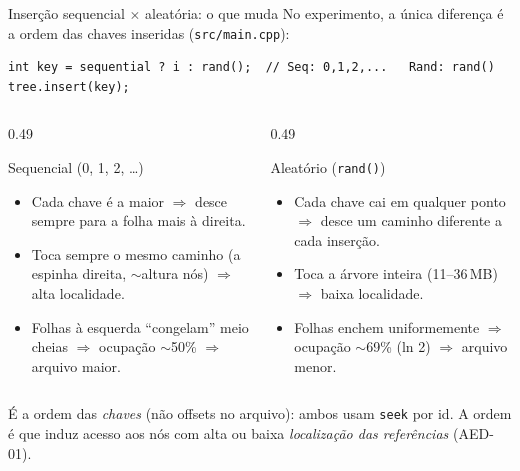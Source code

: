 \documentclass[aspectratio=169,11pt]{beamer}
\begin{document}
\begin{frame}[fragile]{Inserção sequencial {\small$\times$} aleatória: o que muda}
  \footnotesize No experimento, a única diferença é a \alert{ordem das chaves}
  inseridas (\texttt{src/main.cpp}):
  \begin{lstlisting}[basicstyle=\ttfamily\scriptsize]
int key = sequential ? i : rand();  // Seq: 0,1,2,...   Rand: rand()
tree.insert(key);
  \end{lstlisting}
  \vspace{-0.1em}
  \begin{columns}[T,onlytextwidth]
    \begin{column}{0.49\textwidth}
      \begin{block}{Sequencial (0, 1, 2, \dots)}
        \scriptsize
        \begin{itemize}
          \item Cada chave é a maior $\Rightarrow$ desce sempre para a
            \alert{folha mais à direita}.
          \item Toca sempre o mesmo caminho (a \alert{espinha direita},
            $\sim$altura nós) $\Rightarrow$ \alert{alta localidade}.
          \item Folhas à esquerda ``congelam'' meio cheias $\Rightarrow$
            ocupação $\sim$50\% $\Rightarrow$ arquivo \alert{maior}.
        \end{itemize}
      \end{block}
    \end{column}
    \begin{column}{0.49\textwidth}
      \begin{block}{Aleatório (\texttt{rand()})}
        \scriptsize
        \begin{itemize}
          \item Cada chave cai em qualquer ponto $\Rightarrow$ desce um
            \alert{caminho diferente} a cada inserção.
          \item Toca a \alert{árvore inteira} (11--36\,MB) $\Rightarrow$
            \alert{baixa localidade}.
          \item Folhas enchem uniformemente $\Rightarrow$ ocupação
            $\sim$69\% (ln 2) $\Rightarrow$ arquivo \alert{menor}.
        \end{itemize}
      \end{block}
    \end{column}
  \end{columns}
  \vspace{0.2em}
  \footnotesize\color{btgray} É a ordem das \emph{chaves} (não offsets no
  arquivo): ambos usam \texttt{seek} por id. A ordem é que induz acesso aos nós
  com alta ou baixa \emph{localização das referências} (AED-01).
\end{frame}
\end{document}
